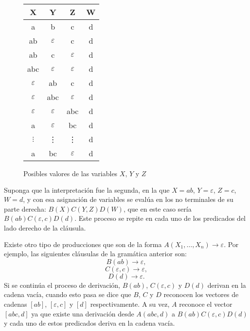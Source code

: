 \documentclass[12pt]{article}
\begin{document}
\begin{figure}
    \centering
    \begin{tabular}{|c|c|c|c|}
        \hline
        X             & Y             & Z             & W \\
        \hline
        a             & b             & c             & d \\
        \hline
        ab            & $\varepsilon$ & c             & d \\
        \hline
        ab            & c             & $\varepsilon$ & d \\
        \hline
        abc           & $\varepsilon$ & $\varepsilon$ & d \\
        \hline
        $\varepsilon$ & ab            & c             & d \\
        \hline
        $\varepsilon$ & abc           & $\varepsilon$ & d \\
        \hline
        $\varepsilon$ & $\varepsilon$ & abc           & d \\
        \hline
        a             & $\varepsilon$ & bc            & d \\
        \hline
        $\vdots$      & \vdots        & \vdots        & d \\
        \hline
        a             & bc            & $\varepsilon$ & d \\
        \hline
    \end{tabular}
    \caption{Posibles valores de las variables $X$, $Y$ y $Z$}
    \label{fig:xyz_eaxmple}
\end{figure}

Suponga que la interpretación fue la segunda, en la que $X=ab$, $Y = \varepsilon$, $Z = c$, $W=d$, y con esa asignación de variables se evalúa en los no terminales de su parte derecha: $B(X)C(Y,Z)D(W)$, que en este caso sería $B(ab)C(\varepsilon,c)D(d)$.  Este proceso se repite en cada uno de los predicados del lado derecho de la cláusula.

Existe otro tipo de producciones que son de la forma $A(X_1,\ldots, X_n)\to \varepsilon$. Por ejemplo, las siguientes cláusulas de la gramática anterior son:
$$B(ab)\to \varepsilon,$$
$$C(\varepsilon,c)\to \varepsilon,$$
$$D(d)\to \varepsilon.$$
Si se continúa el proceso de derivación, $B(ab)$, $C(\varepsilon,c)$ y $D(d)$ derivan en la cadena vacía, cuando esto pasa se dice que $B$, $C$ y $D$ reconocen los vectores de cadenas $[ab]$, $[\varepsilon,c]$ y $[d]$ respectivamente. A su vez, $A$ reconoce el vector $[abc,d]$ ya que existe una derivación desde $A(abc,d)$ a $B(ab)C(\varepsilon,c)D(d)$ y cada uno de estos predicados deriva en la cadena vacía.
\end{document}
